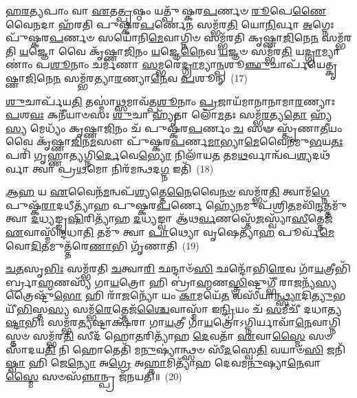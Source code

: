 \-\ul{𑌹}\-\-\ul{𑌰}\-\-\ul{𑌤𑍍𑌯}\-𑌪𑌾𑌂 𑌵𑌾 \ul{𑌏}\-𑌤\-\ul{𑌤𑍍𑌪𑍃}\-𑌷𑍍𑌠𑌂 𑌯𑌤𑍍𑌪𑍁᳴𑌷𑍍𑌕𑌰\-\ul{𑌪}\-𑌰𑍍𑌣𑍞 \ul{𑌰𑍂}\-𑌪𑍇\-\ul{𑌣𑍈}\-𑌵𑍈\-\ul{𑌨}\-𑌦𑌾 𑌹᳴𑌰𑌤𑌿 𑌪𑍁𑌷𑍍𑌕𑌰\-\ul{𑌪}\-𑌰𑍍𑌣𑍇\-\ul{𑌨} 𑌸𑌮𑍍𑌭᳴𑌰\-\ul{𑌤𑌿} 𑌯𑍋\-\ul{𑌨𑌿}\-𑌰𑍍𑌵𑌾 \ul{𑌅}\-𑌗𑍍𑌨𑍇𑌃 𑌪𑍁᳴𑌷𑍍𑌕𑌰\-\ul{𑌪}\-𑌰𑍍𑌣𑍞 𑌸𑌯𑍋᳴𑌨𑌿\-\ul{𑌮𑍇}\-𑌵𑌾𑌗𑍍𑌨𑌿𑍞 𑌸𑌮𑍍𑌭᳴𑌰𑌤𑌿 𑌕𑍃𑌷𑍍𑌣𑌾\-\ul{𑌜𑌿}\-𑌨𑍇\-\ul{𑌨} 𑌸𑌮𑍍𑌭᳴𑌰𑌤𑌿 \ul{𑌯}\-𑌜𑍍𑌞𑍋 𑌵𑍈 𑌕𑍃᳴𑌷𑍍𑌣𑌾\-\ul{𑌜𑌿}\-𑌨𑌂 \ul{𑌯}\-𑌜𑍍𑌞𑍇\-\ul{𑌨𑍈}\-𑌵 \ul{𑌯}\-𑌜𑍍𑌞𑍞 𑌸𑌮𑍍𑌭᳴𑌰\-\ul{𑌤𑌿} 𑌯\-\ul{𑌦𑍍𑌗𑍍𑌰𑌾}\-𑌮𑍍𑌯𑌾𑌣𑌾𑌂॑ 𑌪\-\ul{𑌶𑍂}\-𑌨𑌾𑌂 𑌚𑌰𑍍𑌮᳴𑌣𑌾 \ul{𑌸}\-𑌮𑍍𑌭𑌰𑍇॑\-\ul{𑌦𑍍𑌗𑍍𑌰𑌾}\-𑌮𑍍𑌯𑌾\-\ul{𑌨𑍍𑌪}\-𑌶𑍂\-\ul{𑌞𑍍𑌛𑍁}\-𑌚𑌾𑌰𑍍𑌪᳴𑌯𑍇𑌤𑍍𑌕𑍃𑌷𑍍𑌣𑌾\-\ul{𑌜𑌿}\-𑌨𑍇\-\ul{𑌨} 𑌸𑌮𑍍𑌭᳴𑌰𑌤𑍍𑌯𑌾\-\ul{𑌰}\-𑌣𑍍𑌯𑌾\-\ul{𑌨𑍇}\-𑌵 \ul{𑌪}\-𑌶𑍂𑌨𑍍~(17)

\-\ul{𑌶𑍁}\-𑌚𑌾𑌰𑍍𑌪᳴𑌯\-\ul{𑌤𑌿} 𑌤𑌸𑍍𑌮𑌾॑\-\ul{𑌥𑍍𑌸}\-𑌮𑌾𑌵᳴𑌤𑍍𑌪\-\ul{𑌶𑍂}\-𑌨𑌾𑌂 \ul{𑌪𑍍𑌰}\-𑌜𑌾𑌯᳴𑌮𑌾𑌨𑌾𑌨𑌾𑌮𑌾\-\ul{𑌰}\-𑌣𑍍𑌯𑌾𑌃 \ul{𑌪}\-𑌶\-\ul{𑌵𑌃} 𑌕𑌨𑍀᳴𑌯𑌾𑍞𑌸𑌃 \ul{𑌶𑍁}\-𑌚𑌾 𑌹𑍍𑌯𑍃᳴𑌤𑌾 𑌲𑍋᳴\-\ul{𑌮}\-𑌤𑌃 𑌸𑌮𑍍𑌭᳴\-\ul{𑌰}\-𑌤𑍍𑌯\-\ul{𑌤𑍋} 𑌹𑍍𑌯᳴\-\ul{𑌸𑍍𑌯} 𑌮𑍇𑌧𑍍𑌯𑌂᳴ 𑌕𑍃𑌷𑍍𑌣𑌾\-\ul{𑌜𑌿}\-𑌨𑌂 𑌚᳴ 𑌪𑍁𑌷𑍍𑌕𑌰\-\ul{𑌪}\-𑌰𑍍𑌣𑌂 \ul{𑌚} 𑌸𑍟 𑌸𑍍𑌤𑍃᳴𑌣𑌾\-\ul{𑌤𑍀}\-𑌯𑌂 𑌵𑍈 𑌕𑍃᳴𑌷𑍍𑌣𑌾\-\ul{𑌜𑌿}\-𑌨\-\ul{𑌮}\-𑌸𑍗 𑌪𑍁᳴𑌷𑍍𑌕𑌰\-\ul{𑌪}\-𑌰𑍍𑌣\-\ul{𑌮𑌾}\-𑌭𑍍𑌯𑌾\-\ul{𑌮𑍇}\-𑌵𑍈𑌨᳴𑌮𑍁\-\ul{𑌭}\-𑌯\-\ul{𑌤𑌃} 𑌪𑌰𑌿᳴ 𑌗𑍃𑌹𑍍𑌣𑌾\-\ul{𑌤𑍍𑌯}\-𑌗𑍍𑌨𑌿\-\ul{𑌰𑍍𑌦𑍇}\-𑌵𑍇\-\ul{𑌭𑍍𑌯𑍋} 𑌨𑌿𑌲𑌾᳴𑌯\-\ul{𑌤} 𑌤𑌮\-\ul{𑌥}\-𑌰𑍍𑌵𑌾𑌨𑍍𑌵᳴𑌪\-\ul{𑌶𑍍𑌯}\-𑌦𑌥᳴𑌰𑍍𑌵𑌾 𑌤𑍍𑌵𑌾 𑌪𑍍𑌰\-\ul{𑌥}\-𑌮𑍋 𑌨𑌿𑌰᳴𑌮𑌨𑍍𑌥𑌦\-\ul{𑌗𑍍𑌨} 𑌇𑌤𑌿᳴~(18)

\-\ul{𑌆}\-\-\ul{𑌹} 𑌯 \ul{𑌏}\-𑌵𑍈𑌨᳴\-\ul{𑌮}\-𑌨𑍍𑌵𑌪᳴\-\ul{𑌶𑍍𑌯}\-𑌤𑍍𑌤𑍇\-\ul{𑌨𑍈}\-𑌵𑍈\-\ul{𑌨}\-\-\ul{𑍞} 𑌸𑌮𑍍𑌭᳴𑌰\-\ul{𑌤𑌿} 𑌤𑍍𑌵𑌾𑌮᳴\-\ul{𑌗𑍍𑌨𑍇} 𑌪𑍁𑌷𑍍𑌕᳴\-\ul{𑌰𑌾}\-𑌦𑌧𑍀𑌤𑍍𑌯𑌾᳴𑌹 𑌪𑍁𑌷𑍍𑌕𑌰\-\ul{𑌪}\-𑌰𑍍𑌣𑍇 𑌹𑍍𑌯𑍇᳴\-\ul{𑌨}\-𑌮𑍁𑌪᳴𑌶𑍍𑌰𑌿\-\ul{𑌤}\-𑌮𑌵𑌿᳴\-\ul{𑌨𑍍𑌦}\-𑌤𑍍𑌤𑌮𑍁᳴ 𑌤𑍍𑌵𑌾 \ul{𑌦}\-𑌧𑍍𑌯𑌙𑍍𑌙𑍃\-\ul{𑌷𑌿}\-𑌰𑌿𑌤𑍍𑌯𑌾᳴𑌹 \ul{𑌦}\-𑌧𑍍𑌯𑌙𑍍𑌵𑌾 𑌆᳴𑌥\-\ul{𑌰𑍍𑌵}\-𑌣𑌸𑍍𑌤𑍇᳴\-\ul{𑌜}\-𑌸𑍍𑌵𑍍𑌯𑌾᳴\-\ul{𑌸𑍀}\-𑌤𑍍𑌤𑍇𑌜᳴ \ul{𑌏}\-𑌵𑌾𑌸𑍍𑌮𑌿᳴𑌨𑍍𑌦𑌧𑌾\-\ul{𑌤𑌿} 𑌤𑌮𑍁᳴ 𑌤𑍍𑌵𑌾 \ul{𑌪𑌾}\-𑌥𑍍𑌯𑍋 𑌵𑍃𑌷𑍇𑌤𑍍𑌯𑌾᳴\-\ul{𑌹} 𑌪𑍂𑌰𑍍𑌵᳴\-\ul{𑌮𑍇}\-𑌵𑍋\-\ul{𑌦𑌿}\-𑌤𑌮𑍁𑌤𑍍𑌤᳴𑌰𑍇\-\ul{𑌣𑌾}\-𑌭𑌿 𑌗𑍃᳴𑌣𑌾𑌤𑌿~(19)

\-\ul{𑌚}\-\-\ul{𑌤}\-𑌸𑍃\-\ul{𑌭𑌿𑌃} 𑌸𑌮𑍍𑌭᳴𑌰𑌤𑌿 \ul{𑌚}\-𑌤𑍍𑌵𑌾\-\ul{𑌰𑌿} 𑌛𑌨𑍍𑌦𑌾𑍞᳴\-\ul{𑌸𑌿} 𑌛𑌨𑍍𑌦𑍋᳴𑌭𑌿\-\ul{𑌰𑍇}\-𑌵 𑌗𑌾᳴\-\ul{𑌯}\-𑌤𑍍𑌰𑍀𑌭𑌿᳴𑌰𑍍𑌬𑍍𑌰𑌾\-\ul{𑌹𑍍𑌮}\-𑌣𑌸𑍍𑌯᳴ 𑌗𑌾\-\ul{𑌯}\-𑌤𑍍𑌰𑍋 𑌹𑌿 𑌬𑍍𑌰𑌾॑\-\ul{𑌹𑍍𑌮}\-𑌣\-\ul{𑌸𑍍𑌤𑍍𑌰𑌿}\-॒𑌷𑍍𑌟𑍁𑌗𑍍𑌭𑍀᳴ 𑌰𑌾\-\ul{𑌜}\-𑌨𑍍𑌯᳴\-\ul{𑌸𑍍𑌯} 𑌤𑍍𑌰𑍈𑌷𑍍𑌟𑍁᳴\-\ul{𑌭𑍋} 𑌹𑌿 𑌰𑌾᳴\-\ul{𑌜}\-𑌨𑍍𑌯𑍋᳴ 𑌯𑌂 \ul{𑌕𑌾}\-𑌮𑌯𑍇᳴\-\ul{𑌤} 𑌵𑌸𑍀᳴𑌯𑌾\-\ul{𑌨𑍍𑌥𑍍𑌸𑍍𑌯𑌾}\-𑌦𑌿\-\ul{𑌤𑍍𑌯𑍁}\-𑌭𑌯𑍀᳴\-\ul{𑌭𑌿}\-𑌸𑍍𑌤\-\ul{𑌸𑍍𑌯} 𑌸𑌮𑍍𑌭᳴\-\ul{𑌰𑍇}\-𑌤𑍍𑌤𑍇𑌜᳴\-\ul{𑌶𑍍𑌚𑍈}\-𑌵𑌾𑌸𑍍𑌮𑌾᳴ 𑌇\-\ul{𑌨𑍍𑌦𑍍𑌰𑌿}\-𑌯𑌂 𑌚᳴ \ul{𑌸}\-𑌮𑍀𑌚𑍀᳴ 𑌦𑌧𑌾𑌤𑍍𑌯\-\ul{𑌷𑍍𑌟𑌾}\-𑌭𑌿𑌃 𑌸𑌮𑍍𑌭᳴𑌰\-\ul{𑌤𑍍𑌯}\-𑌷𑍍𑌟𑌾𑌕𑍍𑌷᳴𑌰𑌾 𑌗𑌾\-\ul{𑌯}\-𑌤𑍍𑌰𑍀 𑌗𑌾᳴\-\ul{𑌯}\-𑌤𑍍𑌰𑍋॑\-𑌽𑌗𑍍𑌨𑌿𑌰𑍍𑌯𑌾𑌵𑌾᳴\-\ul{𑌨𑍇}\-𑌵𑌾𑌗𑍍𑌨𑌿𑌸𑍍𑌤𑍞 𑌸𑌮𑍍𑌭᳴𑌰\-\ul{𑌤𑌿} 𑌸𑍀𑌦᳴ 𑌹𑍋\-\ul{𑌤}\-𑌰𑌿𑌤𑍍𑌯𑌾᳴𑌹 \ul{𑌦𑍇}\-𑌵𑌤𑌾᳴ \ul{𑌏}\-𑌵𑌾\-\ul{𑌸𑍍𑌮𑍈} 𑌸𑍞 𑌸𑌾᳴𑌦𑌯\-\ul{𑌤𑌿} 𑌨𑌿 𑌹𑍋𑌤𑍇𑌤𑌿᳴ 𑌮\-\ul{𑌨𑍁}\-𑌷𑍍𑌯𑌾॑𑌨𑍍𑌥𑍍𑌸𑍞 𑌸𑍀᳴\-\ul{𑌦}\-𑌸𑍍𑌵𑍇\-\ul{𑌤𑌿} 𑌵𑌯𑌾𑍞᳴\-\ul{𑌸𑌿} 𑌜𑌨𑌿᳴\-\ul{𑌷𑍍𑌵𑌾} 𑌹𑌿 𑌜𑍇\-\ul{𑌨𑍍𑌯𑍋} 𑌅\-\ul{𑌗𑍍𑌰𑍇} 𑌅\-\ul{𑌹𑍍𑌨𑌾}\-𑌮𑌿𑌤𑍍𑌯𑌾᳴𑌹 𑌦𑍇𑌵𑌮\-\ul{𑌨𑍁}\-𑌷𑍍𑌯𑌾\-\ul{𑌨𑍇}\-𑌵𑌾\-\ul{𑌸𑍍𑌮𑍈} 𑌸𑍞𑌸᳴\-\ul{𑌨𑍍𑌨𑌾}\-𑌨𑍍𑌪𑍍𑌰 𑌜᳴𑌨𑌯𑌤𑌿॥~(20)

